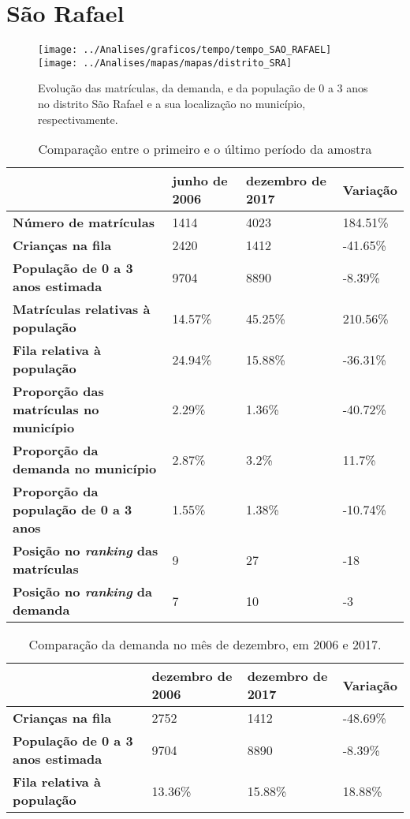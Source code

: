 \section{São Rafael}
\begin{figure}[H]
	\centering
	\texttt{[image: ../Analises/graficos/tempo/tempo\_SAO\_RAFAEL]}
	\texttt{[image: ../Analises/mapas/mapas/distrito\_SRA]}
	\caption{Evolução das matrículas, da demanda, e da população de 0 a 3 anos no distrito São Rafael e a sua localização no município, respectivamente.}
\end{figure}
\begin{table}[H]
	\begin{tabular}{|l|l|l|l|}
		\hline
		\textbf{}                                      & \textbf{junho de 2006}       & \textbf{dezembro de 2017}    & \textbf{Variação} \\ \hline
		\textbf{Número de matrículas}                  & 1414 & 4023 & 184.51\% \\ \hline
		\textbf{Crianças na fila}                      & 2420 & 1412 & -41.65\% \\ \hline
		\textbf{População de 0 a 3 anos estimada}      & 9704 & 8890 & -8.39\% \\ \hline
		\textbf{Matrículas relativas à população}      & 14.57\% & 45.25\% & 210.56\% \\ \hline
		\textbf{Fila relativa à população}             & 24.94\% & 15.88\% & -36.31\% \\ \hline
		\textbf{Proporção das matrículas no município} & 2.29\% & 1.36\% & -40.72\% \\ \hline
		\textbf{Proporção da demanda no município}     & 2.87\% & 3.2\% & 11.7\% \\ \hline
		\textbf{Proporção da população de 0 a 3 anos}  & 1.55\% & 1.38\% & -10.74\% \\ \hline
		\textbf{Posição no \textit{ranking} das matrículas}     & 9 & 27 & -18 \\ \hline
		\textbf{Posição no \textit{ranking} da demanda}         & 7 & 10 & -3 \\ \hline
	\end{tabular}
	\caption{Comparação entre o primeiro e o último período da amostra}
\end{table}
\begin{table}[H]
	\begin{tabular}{|l|l|l|l|}
		\hline
		\textbf{}                                 & \textbf{dezembro de 2006} & \textbf{dezembro de 2017} & \textbf{Variação} \\ \hline
		\textbf{Crianças na fila}                      & 2752 & 1412 & -48.69\% \\ \hline
		\textbf{População de 0 a 3 anos estimada}      & 9704 & 8890 & -8.39\% \\ \hline
		\textbf{Fila relativa à população}             & 13.36\% & 15.88\% & 18.88\% \\ \hline
	\end{tabular}
	\caption{Comparação da demanda no mês de dezembro, em 2006 e 2017.}
\end{table}
